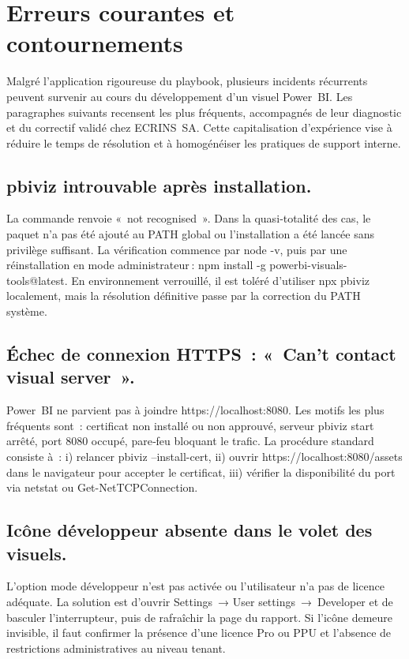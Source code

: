 
\section{Erreurs courantes et contournements}\label{sec:ch4_troubleshoot}

Malgré l’application rigoureuse du playbook, plusieurs incidents récurrents peuvent survenir au cours du développement d’un visuel Power BI. Les paragraphes suivants recensent les plus fréquents, accompagnés de leur diagnostic et du correctif validé chez ECRINS SA. Cette capitalisation d’expérience vise à réduire le temps de résolution et à homogénéiser les pratiques de support interne.

\subsection{pbiviz introuvable après installation.} La commande renvoie « not recognised ». Dans la quasi‑totalité des cas, le paquet n’a pas été ajouté au \textsc{PATH} global ou l’installation a été lancée sans privilège suffisant. La vérification commence par node -v, puis par une réinstallation en mode administrateur : npm install -g powerbi-visuals-tools@latest. En environnement verrouillé, il est toléré d’utiliser npx pbiviz localement, mais la résolution définitive passe par la correction du \textsc{PATH} système.

\subsection{Échec de connexion HTTPS : « Can’t contact visual server ».} Power BI ne parvient pas à joindre https://localhost:8080. Les motifs les plus fréquents sont : certificat non installé ou non approuvé, serveur pbiviz start arrêté, port 8080 occupé, pare‑feu bloquant le trafic. La procédure standard consiste à : i) relancer pbiviz --install-cert, ii) ouvrir https://localhost:8080/assets dans le navigateur pour accepter le certificat, iii) vérifier la disponibilité du port via netstat ou Get-NetTCPConnection.

\subsection{Icône développeur absente dans le volet des visuels.} L’option mode développeur n’est pas activée ou l’utilisateur n’a pas de licence adéquate. La solution est d’ouvrir Settings → User settings → Developer et de basculer l’interrupteur, puis de rafraîchir la page du rapport. Si l’icône demeure invisible, il faut confirmer la présence d’une licence Pro ou PPU et l’absence de restrictions administratives au niveau tenant.

